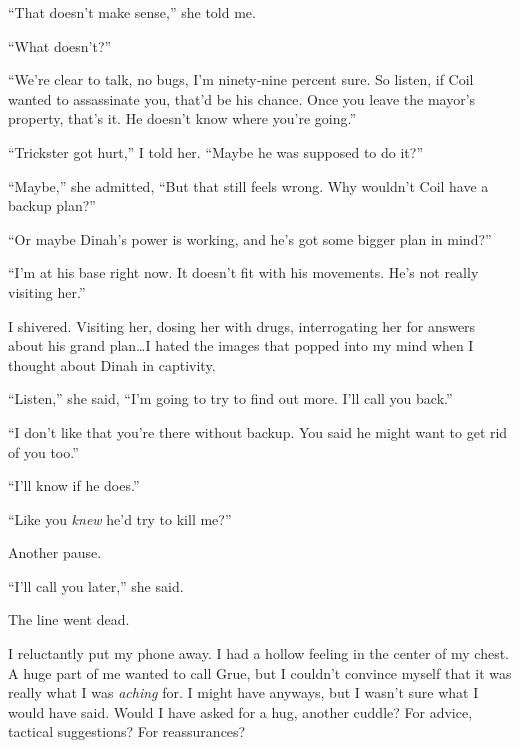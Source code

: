 ``That doesn't make sense,'' she told me.



``What doesn't?''



``We're clear to talk, no bugs, I'm ninety-nine percent sure.  So listen, if Coil wanted to assassinate you, that'd be his chance.  Once you leave the mayor's property, that's it.  He doesn't know where you're going.''



``Trickster got hurt,'' I told her.  ``Maybe he was supposed to do it?''



``Maybe,'' she admitted, ``But that still feels wrong.  Why wouldn't Coil have a backup plan?''



``Or maybe Dinah's power is working, and he's got some bigger plan in mind?''



``I'm at his base right now.  It doesn't fit with his movements.  He's not really visiting her.''



I shivered.  Visiting her, dosing her with drugs, interrogating her for answers about his grand plan\ldots I hated the images that popped into my mind when I thought about Dinah in captivity.



``Listen,'' she said, ``I'm going to try to find out more.  I'll call you back.''



``I don't like that you're there without backup.  You said he might want to get rid of you too.''



``I'll know if he does.''



``Like you \emph{knew} he'd try to kill me?''



Another pause.



``I'll call you later,'' she said.



The line went dead.



I reluctantly put my phone away.  I had a hollow feeling in the center of my chest.  A huge part of me wanted to call Grue, but I couldn't convince myself that it was really what I was \emph{aching} for.  I might have anyways, but I wasn't sure what I would have said.  Would I have asked for a hug, another cuddle?  For advice, tactical suggestions?  For reassurances?



